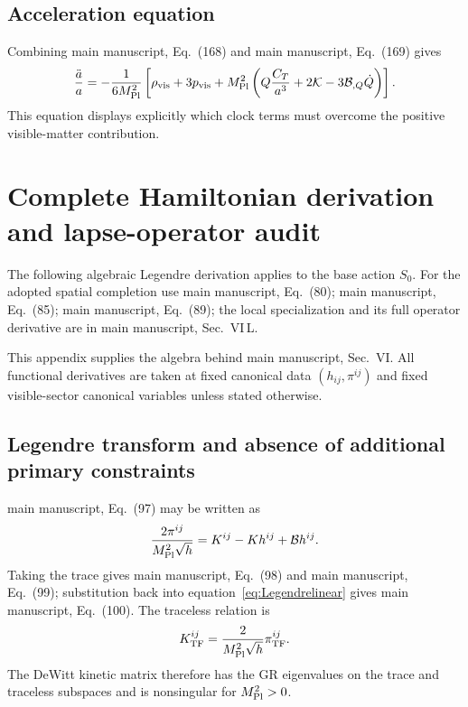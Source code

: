 \documentclass[aps,prd,reprint,onecolumn,notitlepage,nofootinbib,longbibliography,floatfix]{revtex4-2}
\theoremstyle{scstyle}
\theoremstyle{definition}
\theoremstyle{remark}
\newcommand{\mpl}{M_{\rm Pl}}
\newcommand{\cK}{\mathcal K}
\newcommand{\cB}{\mathcal B}
\newcommand{\vis}{\mathrm{vis}}
\begin{document}
\subsection{Acceleration equation}

Combining main manuscript, Eq.~(168) and main manuscript, Eq.~(169) gives
\begin{equation}
\frac{\ddot a}{a}
=-\frac{1}{6\mpl^2}
\left[
\rho_{\vis}+3p_{\vis}
+\mpl^2\left(Q\frac{C_T}{a^3}+2\cK-3\cB_{,Q}\dot Q\right)
\right].
\label{eq:accelerationfull}
\end{equation}
This equation displays explicitly which clock terms must overcome the positive visible-matter contribution.

\section{Complete Hamiltonian derivation and lapse-operator audit}
\label{app:Hamiltonian}

The following algebraic Legendre derivation applies to the base action $S_0$. For the adopted spatial completion use main manuscript, Eq.~(80); main manuscript, Eq.~(85); main manuscript, Eq.~(89); the local specialization and its full operator derivative are in main manuscript, Sec.~VI\,L.

This appendix supplies the algebra behind main manuscript, Sec.~VI. All functional derivatives are taken at fixed canonical data $(h_{ij},\pi^{ij})$ and fixed visible-sector canonical variables unless stated otherwise.

\subsection{Legendre transform and absence of additional primary constraints}
\label{app:Legendre}

main manuscript, Eq.~(97) may be written as
\begin{equation}
\frac{2\pi^{ij}}{\mpl^2\sqrt h}
=K^{ij}-Kh^{ij}+\cB h^{ij}.
\label{eq:Legendrelinear}
\end{equation}
Taking the trace gives main manuscript, Eq.~(98) and main manuscript, Eq.~(99); substitution back into equation~\eqref{eq:Legendrelinear} gives main manuscript, Eq.~(100). The traceless relation is
\begin{equation}
K^{ij}_{\rm TF}
=\frac{2}{\mpl^2\sqrt h}\pi^{ij}_{\rm TF}.
\label{eq:KTF}
\end{equation}
The DeWitt kinetic matrix therefore has the GR eigenvalues on the trace and traceless subspaces and is nonsingular for $\mpl^2>0$.
\end{document}
